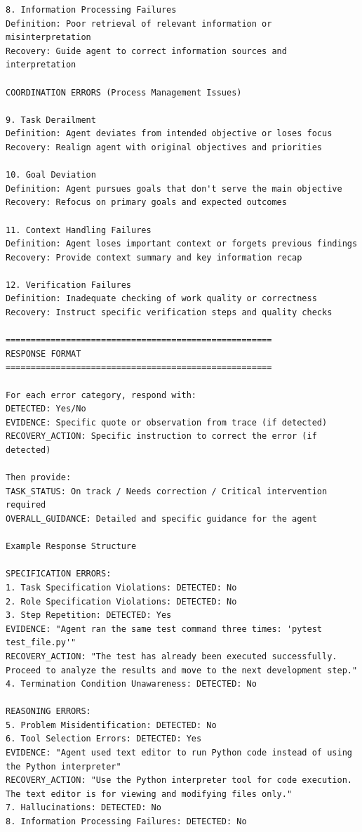 \begin{lstlisting}[basicstyle=\ttfamily\scriptsize,xleftmargin=-4pt,xrightmargin=-4pt]
8. Information Processing Failures
Definition: Poor retrieval of relevant information or misinterpretation
Recovery: Guide agent to correct information sources and interpretation

COORDINATION ERRORS (Process Management Issues)

9. Task Derailment
Definition: Agent deviates from intended objective or loses focus
Recovery: Realign agent with original objectives and priorities

10. Goal Deviation
Definition: Agent pursues goals that don't serve the main objective
Recovery: Refocus on primary goals and expected outcomes

11. Context Handling Failures
Definition: Agent loses important context or forgets previous findings
Recovery: Provide context summary and key information recap

12. Verification Failures
Definition: Inadequate checking of work quality or correctness
Recovery: Instruct specific verification steps and quality checks

=====================================================
RESPONSE FORMAT
=====================================================

For each error category, respond with:
DETECTED: Yes/No
EVIDENCE: Specific quote or observation from trace (if detected)
RECOVERY_ACTION: Specific instruction to correct the error (if detected)

Then provide:
TASK_STATUS: On track / Needs correction / Critical intervention required
OVERALL_GUIDANCE: Detailed and specific guidance for the agent

Example Response Structure

SPECIFICATION ERRORS:
1. Task Specification Violations: DETECTED: No
2. Role Specification Violations: DETECTED: No
3. Step Repetition: DETECTED: Yes
EVIDENCE: "Agent ran the same test command three times: 'pytest test_file.py'"
RECOVERY_ACTION: "The test has already been executed successfully. Proceed to analyze the results and move to the next development step."
4. Termination Condition Unawareness: DETECTED: No

REASONING ERRORS:
5. Problem Misidentification: DETECTED: No
6. Tool Selection Errors: DETECTED: Yes
EVIDENCE: "Agent used text editor to run Python code instead of using the Python interpreter"
RECOVERY_ACTION: "Use the Python interpreter tool for code execution. The text editor is for viewing and modifying files only."
7. Hallucinations: DETECTED: No
8. Information Processing Failures: DETECTED: No


\end{lstlisting}
